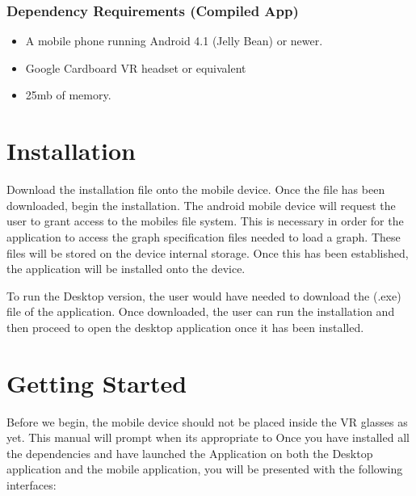 \documentclass[english]{article}
\begin{document}
\subsubsection{Dependency Requirements (Compiled App)}

\begin{itemize}
   \item A mobile phone running Android 4.1 (Jelly Bean) or newer.
   \item Google Cardboard VR headset or equivalent
   \item 25mb of memory. 
\end{itemize} 


\section{Installation}
Download the installation file onto the mobile device. Once the file has been downloaded, begin the installation. The android mobile device will request the user to grant access to the mobiles file system. This is necessary in order for the application to access the graph specification files needed to load a graph. These files will be stored on the device internal storage. Once this has been established, the application will be installed onto the device. 

To run the Desktop version, the user would have needed to download the (.exe) file of the application. Once downloaded, the user can run the installation and then proceed to open the desktop application once it has been installed. 
 
\section{Getting Started}
Before we begin, the mobile device should not be placed inside the VR glasses as yet. This manual will prompt when its appropriate to 
Once you have installed all the dependencies and have launched the Application on both the Desktop application and the mobile application, you will be presented with the following interfaces:
\end{document}

